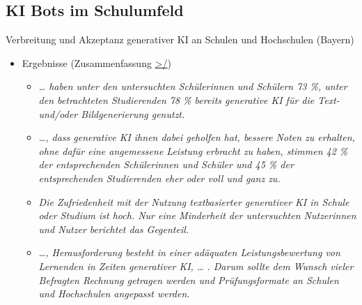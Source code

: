 \documentclass[
  letterpaper,
  DIV=11,
  numbers=noendperiod]{scrartcl}
\providecommand{\tightlist}{%
  \setlength{\itemsep}{0pt}\setlength{\parskip}{0pt}}\usepackage{longtable,booktabs,array}
\begin{document}
\subsection{KI Bots im Schulumfeld}\label{ki-bots-im-schulumfeld-1}

Verbreitung und Akzeptanz generativer KI an Schulen und Hochschulen
(Bayern)

\begin{itemize}
\item
  Ergebnisse (Zusammenfassung
  \href{https://www.bidt.digital/publikation/verbreitung-und-akzeptanz-generativer-ki-an-schulen-und-hochschulen/}{\textgreater/})

  \begin{itemize}
  \tightlist
  \item
    \emph{\ldots{} haben unter den untersuchten Schülerinnen und
    Schülern 73 \%, unter den betrachteten Studierenden 78 \% bereits
    generative KI für die Text- und/oder Bildgenerierung genutzt.}
  \item
    \emph{\ldots, dass generative KI ihnen dabei geholfen hat, bessere
    Noten zu erhalten, ohne dafür eine angemessene Leistung erbracht zu
    haben, stimmen 42 \% der entsprechenden Schülerinnen und Schüler und
    45 \% der entsprechenden Studierenden eher oder voll und ganz zu.}
  \item
    \emph{Die Zufriedenheit mit der Nutzung textbasierter generativer KI
    in Schule oder Studium ist hoch. Nur eine Minderheit der
    untersuchten Nutzerinnen und Nutzer berichtet das Gegenteil.}
  \item
    \emph{\ldots, Herausforderung besteht in einer adäquaten
    Leistungsbewertung von Lernenden in Zeiten generativer KI, \ldots{}
    . Darum sollte dem Wunsch vieler Befragten Rechnung getragen werden
    und Prüfungsformate an Schulen und Hochschulen angepasst werden.}
  \end{itemize}
\end{itemize}
\end{document}
